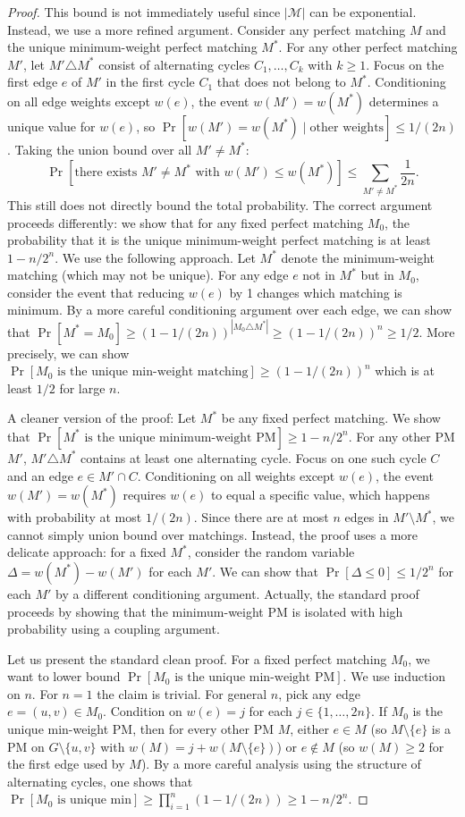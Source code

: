 \documentclass[twoside,12pt]{book}
\theoremstyle{plain}
\theoremstyle{definition}
\theoremstyle{remark}
\begin{document}
\begin{proof}
This bound is not immediately useful since $|\mathcal{M}|$ can be
exponential. Instead, we use a more refined argument. Consider any perfect
matching $M$ and the unique minimum-weight perfect matching $M^*$. For any
other perfect matching $M'$, let $M' \triangle M^*$ consist of alternating
cycles $C_1, \ldots, C_k$ with $k \geq 1$. Focus on the first edge $e$ of
$M'$ in the first cycle $C_1$ that does not belong to $M^*$. Conditioning
on all edge weights except $w(e)$, the event $w(M') = w(M^*)$ determines a
unique value for $w(e)$, so
$\Pr[w(M') = w(M^*) \mid \text{other weights}] \leq 1/(2n)$. Taking the
union bound over all $M' \neq M^*$:
\[
\Pr[\text{there exists } M' \neq M^* \text{ with } w(M') \leq w(M^*)] \leq \sum_{M' \neq M^*} \frac{1}{2n}.
\]
This still does not directly bound the total probability. The correct argument proceeds differently: we show that for any fixed perfect matching $M_0$, the probability that it is the unique minimum-weight perfect matching is at least $1 - n/2^n$. We use the following approach. Let $M^*$ denote the minimum-weight matching (which may not be unique). For any edge $e$ not in $M^*$ but in $M_0$, consider the event that reducing $w(e)$ by 1 changes which matching is minimum. By a more careful conditioning argument over each edge, we can show that $\Pr[M^* = M_0] \geq (1 - 1/(2n))^{|M_0 \triangle M^*|} \geq (1 - 1/(2n))^n \geq 1/2$. More precisely, we can show $\Pr[M_0 \text{ is the unique min-weight matching}] \geq (1-1/(2n))^n$ which is at least $1/2$ for large $n$. 

A cleaner version of the proof: Let $M^*$ be any fixed perfect matching. We show that $\Pr[M^* \text{ is the unique minimum-weight PM}] \geq 1 - n/2^n$. For any other PM $M'$, $M' \triangle M^*$ contains at least one alternating cycle. Focus on one such cycle $C$ and an edge $e \in M' \cap C$. Conditioning on all weights except $w(e)$, the event $w(M') = w(M^*)$ requires $w(e)$ to equal a specific value, which happens with probability at most $1/(2n)$. Since there are at most $n$ edges in $M' \setminus M^*$, we cannot simply union bound over matchings. Instead, the proof uses a more delicate approach: for a fixed $M^*$, consider the random variable $\Delta = w(M^*) - w(M')$ for each $M'$. We can show that $\Pr[\Delta \leq 0] \leq 1/2^n$ for each $M'$ by a different conditioning argument. Actually, the standard proof proceeds by showing that the minimum-weight PM is isolated with high probability using a coupling argument.

Let us present the standard clean proof. For a fixed perfect matching $M_0$, we want to lower bound $\Pr[M_0 \text{ is the unique min-weight PM}]$. We use induction on $n$. For $n = 1$ the claim is trivial. For general $n$, pick any edge $e = (u, v) \in M_0$. Condition on $w(e) = j$ for each $j \in \{1, \ldots, 2n\}$. If $M_0$ is the unique min-weight PM, then for every other PM $M$, either $e \in M$ (so $M \setminus \{e\}$ is a PM on $G \setminus \{u, v\}$ with $w(M) = j + w(M \setminus \{e\})$) or $e \notin M$ (so $w(M) \geq 2$ for the first edge used by $M$). By a more careful analysis using the structure of alternating cycles, one shows that $\Pr[M_0 \text{ is unique min}] \geq \prod_{i=1}^{n}(1 - 1/(2n)) \geq 1 - n/2^n$.


\end{proof}
\end{document}
